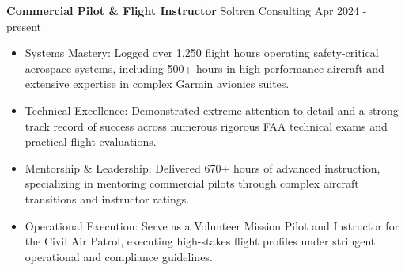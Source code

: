 \textbf{Commercial Pilot \& Flight Instructor} Soltren Consulting \hfill Apr 2024 - present

\begin{itemize} \itemsep -2pt

        \item Systems Mastery: Logged over 1,250 flight hours operating safety-critical aerospace systems, including 500+ hours in high-performance aircraft and extensive expertise in complex Garmin avionics suites.

        \item Technical Excellence: Demonstrated extreme attention to detail and a strong track record of success across numerous rigorous FAA technical exams and practical flight evaluations.

        \item Mentorship \& Leadership: Delivered 670+ hours of advanced instruction, specializing in mentoring commercial pilots through complex aircraft transitions and instructor ratings.

        \item Operational Execution: Serve as a Volunteer Mission Pilot and Instructor for the Civil Air Patrol, executing high-stakes flight profiles under stringent operational and compliance guidelines.

\end{itemize}

